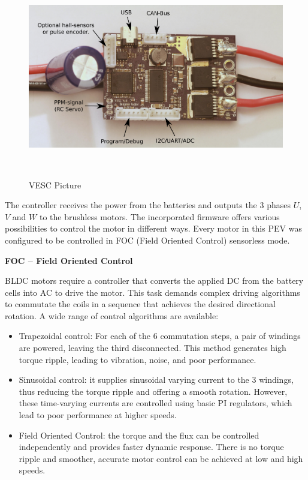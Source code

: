 \begin{figure}[h!]
	\includegraphics[width=1\linewidth]{figs/05/vesc}
	\caption{VESC Picture}
	\\[-1cm]
\end{figure}

The controller receives the power from the batteries and outputs the 3 phases $U$, $V$ and $W$ to the brushless motors. The incorporated firmware offers various possibilities to control the motor in different ways. Every motor in this PEV was configured to be controlled in FOC (Field Oriented Control) sensorless mode.

\textbf{FOC -- Field Oriented Control}

BLDC motors require a controller that converts the applied DC from the battery cells into AC to drive the motor. This task demands complex driving algorithms to commutate the coils in a sequence that achieves the desired directional rotation. A wide range of control algorithms are available:

\begin{itemize}
\begin{itemize}
	\item Trapezoidal control: For each of the 6 commutation steps, a pair of windings are powered, leaving the third disconnected. This method generates high torque ripple, leading to vibration, noise, and poor performance.
	
	\item Sinusoidal control: it supplies sinusoidal varying current to the 3 windings, thus reducing the torque ripple and offering a smooth rotation. However, these time-varying currents are controlled using basic PI regulators, which lead to poor performance at higher speeds.
	
	\item Field Oriented Control: the torque and the flux can be controlled independently and provides faster dynamic response. There is no torque ripple and smoother, accurate motor control can be achieved at low and high speeds.
\end{itemize}
\end{itemize}

